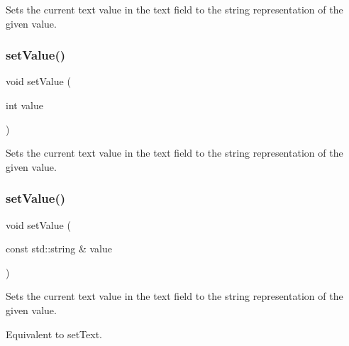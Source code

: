 Sets the current text value in the text field to the string representation of the given value. 

\mbox{\label{classGTextField_a23d79e21b8ed72e19278ca31d47b8c87}} 
\subsubsection{\texorpdfstring{set\+Value()}{setValue()}\hspace{0.1cm}{\footnotesize\ttfamily [4/5]}}
{\footnotesize\ttfamily void set\+Value (\begin{DoxyParamCaption}\item[{int}]{value }\end{DoxyParamCaption})\hspace{0.3cm}{\ttfamily [virtual]}}



Sets the current text value in the text field to the string representation of the given value. 

\mbox{\label{classGTextField_ab18c7a418be64c4f909beebc277a1321}} 
\subsubsection{\texorpdfstring{set\+Value()}{setValue()}\hspace{0.1cm}{\footnotesize\ttfamily [5/5]}}
{\footnotesize\ttfamily void set\+Value (\begin{DoxyParamCaption}\item[{const std\+::string \&}]{value }\end{DoxyParamCaption})\hspace{0.3cm}{\ttfamily [virtual]}}



Sets the current text value in the text field to the string representation of the given value. 

Equivalent to set\+Text. \mbox{\label{classGInteractor_a18e44e30b31525a243960ca3928125aa}} 

